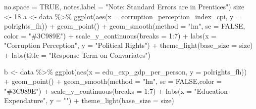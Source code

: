 \documentclass[
  english,
  man,floatsintext]{apa6}
\newenvironment{Shaded}{\begin{snugshade}}{\end{snugshade}}
\newcommand{\AttributeTok}[1]{\textcolor[rgb]{0.77,0.63,0.00}{#1}}
\newcommand{\ConstantTok}[1]{\textcolor[rgb]{0.00,0.00,0.00}{#1}}
\newcommand{\DecValTok}[1]{\textcolor[rgb]{0.00,0.00,0.81}{#1}}
\newcommand{\FunctionTok}[1]{\textcolor[rgb]{0.00,0.00,0.00}{#1}}
\newcommand{\NormalTok}[1]{#1}
\newcommand{\OtherTok}[1]{\textcolor[rgb]{0.56,0.35,0.01}{#1}}
\newcommand{\SpecialCharTok}[1]{\textcolor[rgb]{0.00,0.00,0.00}{#1}}
\newcommand{\StringTok}[1]{\textcolor[rgb]{0.31,0.60,0.02}{#1}}
\begin{document}
\begin{Shaded}
\begin{Highlighting}[]
                     \AttributeTok{no.space =} \ConstantTok{TRUE}\NormalTok{, }
                     \AttributeTok{notes.label =} \StringTok{"Note: Standard Errors are in Prentices"}\NormalTok{)}
\NormalTok{size }\OtherTok{\textless{}{-}} \DecValTok{18}
\NormalTok{a }\OtherTok{\textless{}{-}}\NormalTok{ data }\SpecialCharTok{\%\textgreater{}\%} 
  \FunctionTok{ggplot}\NormalTok{(}\FunctionTok{aes}\NormalTok{(}\AttributeTok{x =}\NormalTok{ corruption\_perception\_index\_cpi, }\AttributeTok{y =}\NormalTok{ polrights\_fh)) }\SpecialCharTok{+} 
  \FunctionTok{geom\_point}\NormalTok{() }\SpecialCharTok{+} 
  \FunctionTok{geom\_smooth}\NormalTok{(}\AttributeTok{method =} \StringTok{"lm"}\NormalTok{, }\AttributeTok{se =} \ConstantTok{FALSE}\NormalTok{, }\AttributeTok{color =} \StringTok{"\#3C989E"}\NormalTok{) }\SpecialCharTok{+} 
  \FunctionTok{scale\_y\_continuous}\NormalTok{(}\AttributeTok{breaks =} \DecValTok{1}\SpecialCharTok{:}\DecValTok{7}\NormalTok{) }\SpecialCharTok{+} 
  \FunctionTok{labs}\NormalTok{(}\AttributeTok{x =} \StringTok{"Corruption Perception"}\NormalTok{, }\AttributeTok{y =} \StringTok{"Political Rights"}\NormalTok{) }\SpecialCharTok{+}
  \FunctionTok{theme\_light}\NormalTok{(}\AttributeTok{base\_size =}\NormalTok{ size) }\SpecialCharTok{+} \FunctionTok{labs}\NormalTok{(}\AttributeTok{title =} \StringTok{"Response Term on Convariates"}\NormalTok{)}

\NormalTok{b }\OtherTok{\textless{}{-}}\NormalTok{ data }\SpecialCharTok{\%\textgreater{}\%} 
  \FunctionTok{ggplot}\NormalTok{(}\FunctionTok{aes}\NormalTok{(}\AttributeTok{x =}\NormalTok{ edu\_exp\_gdp\_per\_person, }\AttributeTok{y =}\NormalTok{ polrights\_fh)) }\SpecialCharTok{+} 
  \FunctionTok{geom\_point}\NormalTok{() }\SpecialCharTok{+} 
  \FunctionTok{geom\_smooth}\NormalTok{(}\AttributeTok{method =} \StringTok{"lm"}\NormalTok{, }\AttributeTok{se =} \ConstantTok{FALSE}\NormalTok{,}\AttributeTok{color =} \StringTok{"\#3C989E"}\NormalTok{) }\SpecialCharTok{+}
    \FunctionTok{scale\_y\_continuous}\NormalTok{(}\AttributeTok{breaks =} \DecValTok{1}\SpecialCharTok{:}\DecValTok{7}\NormalTok{) }\SpecialCharTok{+} 
  \FunctionTok{labs}\NormalTok{(}\AttributeTok{x =} \StringTok{"Education Expendature"}\NormalTok{, }\AttributeTok{y =} \StringTok{""}\NormalTok{) }\SpecialCharTok{+}
  \FunctionTok{theme\_light}\NormalTok{(}\AttributeTok{base\_size =}\NormalTok{ size)}


\end{Highlighting}
\end{Shaded}
\end{document}
